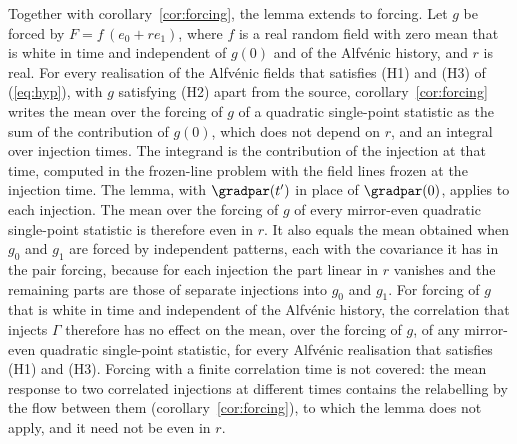 Together with corollary~\ref{cor:forcing}, the lemma extends to forcing. Let $g$ be forced by $F=f\,(e_0+re_1)$, where $f$ is a real random field with zero mean that is white in time and independent of $g(0)$ and of the Alfv\'enic history, and $r$ is real. For every realisation of the Alfv\'enic fields that satisfies (H1) and (H3) of (\ref{eq:hyp}), with $g$ satisfying (H2) apart from the source, corollary~\ref{cor:forcing} writes the mean over the forcing of $g$ of a quadratic single-point statistic as the sum of the contribution of $g(0)$, which does not depend on $r$, and an integral over injection times. The integrand is the contribution of the injection at that time, computed in the frozen-line problem with the field lines frozen at the injection time. The lemma, with $\gradpar(t')$ in place of $\gradpar(0)$, applies to each injection. The mean over the forcing of $g$ of every mirror-even quadratic single-point statistic is therefore even in $r$. It also equals the mean obtained when $g_0$ and $g_1$ are forced by independent patterns, each with the covariance it has in the pair forcing, because for each injection the part linear in $r$ vanishes and the remaining parts are those of separate injections into $g_0$ and $g_1$. For forcing of $g$ that is white in time and independent of the Alfv\'enic history, the correlation that injects $\Gamma$ therefore has no effect on the mean, over the forcing of $g$, of any mirror-even quadratic single-point statistic, for every Alfv\'enic realisation that satisfies (H1) and (H3). Forcing with a finite correlation time is not covered: the mean response to two correlated injections at different times contains the relabelling by the flow between them (corollary~\ref{cor:forcing}), to which the lemma does not apply, and it need not be even in $r$.

